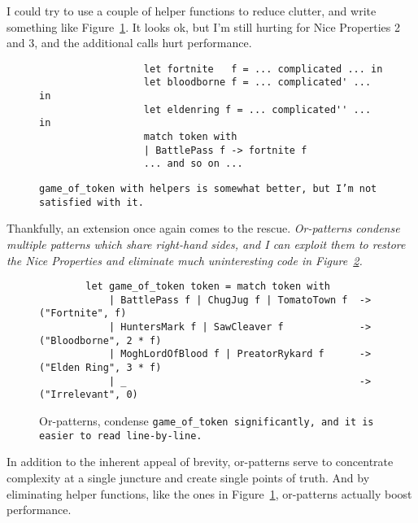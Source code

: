 \documentclass[manuscript,screen,review, 12pt, nonacm]{acmart}
\begin{document}
\begin{outline}[enumerate]
        I could try to use a couple of helper functions to reduce clutter, and
        write something like Figure~\ref{fig:helpergot}. It looks ok, but I'm
        still hurting for Nice Properties 2 and 3, and the additional calls
        hurt performance. 

        \begin{figure}
            \begin{center}
                \begin{verbatim}
                  let fortnite   f = ... complicated ... in
                  let bloodborne f = ... complicated' ... in
                  let eldenring f = ... complicated'' ... in
                  match token with
                  | BattlePass f -> fortnite f
                  ... and so on ...                
                \end{verbatim}
            \end{center}    
        \caption{\tt{game\_of\_token} with helpers is somewhat better, but I'm
        not satisfied with it.} 
        \label{fig:helpergot}
        \end{figure}

        Thankfully, an extension once again comes to the rescue.
        \it{Or-patterns} condense multiple patterns which share right-hand
        sides, and I can exploit them to restore the Nice Properties and
        eliminate much uninteresting code in Figure~\ref{fig:orgot}.

    \begin{figure}
    \begin{center}
    \begin{verbatim}
        let game_of_token token = match token with 
            | BattlePass f | ChugJug f | TomatoTown f  -> ("Fortnite", f)
            | HuntersMark f | SawCleaver f             -> ("Bloodborne", 2 * f)
            | MoghLordOfBlood f | PreatorRykard f      -> ("Elden Ring", 3 * f)
            | _                                        -> ("Irrelevant", 0)
    \end{verbatim}
    \end{center}    
    \caption{Or-patterns, condense \tt{game\_of\_token}
    significantly, and it is easier to read line-by-line.} 
    \label{fig:orgot}
    \end{figure}

    In addition to the inherent appeal of brevity, or-patterns serve to
    concentrate complexity at a single juncture and create single points of
    truth. And by eliminating helper functions, like the ones in
    Figure~\ref{fig:helpergot}, or-patterns actually boost performance.
      

\end{outline}
\end{document}

